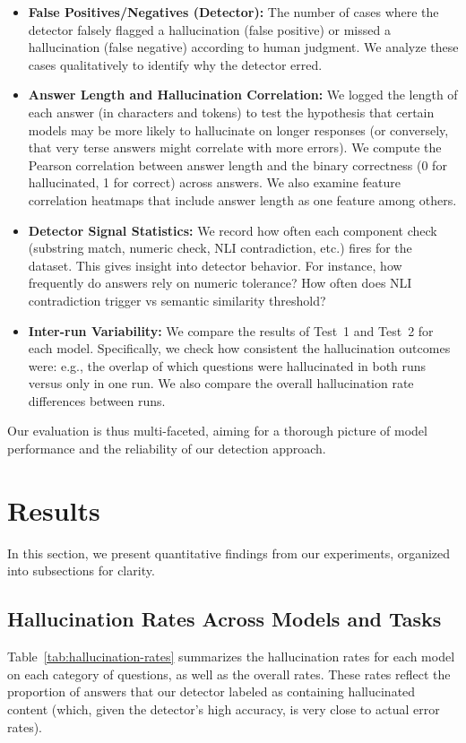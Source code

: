 \documentclass{article}
\begin{document}
\begin{itemize}
    \item \textbf{False Positives/Negatives (Detector):} The number of cases where the detector falsely flagged a hallucination (false positive) or missed a hallucination (false negative) according to human judgment. We analyze these cases qualitatively to identify why the detector erred.
    \item \textbf{Answer Length and Hallucination Correlation:} We logged the length of each answer (in characters and tokens) to test the hypothesis that certain models may be more likely to hallucinate on longer responses (or conversely, that very terse answers might correlate with more errors). We compute the Pearson correlation between answer length and the binary correctness (0 for hallucinated, 1 for correct) across answers. We also examine feature correlation heatmaps that include answer length as one feature among others.
    \item \textbf{Detector Signal Statistics:} We record how often each component check (substring match, numeric check, NLI contradiction, etc.) fires for the dataset. This gives insight into detector behavior. For instance, how frequently do answers rely on numeric tolerance? How often does NLI contradiction trigger vs semantic similarity threshold?
    \item \textbf{Inter-run Variability:} We compare the results of Test~1 and Test~2 for each model. Specifically, we check how consistent the hallucination outcomes were: e.g., the overlap of which questions were hallucinated in both runs versus only in one run. We also compare the overall hallucination rate differences between runs.
\end{itemize}

Our evaluation is thus multi-faceted, aiming for a thorough picture of model performance and the reliability of our detection approach.

\section{Results}\label{sec:results}
In this section, we present quantitative findings from our experiments, organized into subsections for clarity.

\subsection{Hallucination Rates Across Models and Tasks}
Table~\ref{tab:hallucination-rates} summarizes the hallucination rates for each model on each category of questions, as well as the overall rates. These rates reflect the proportion of answers that our detector labeled as containing hallucinated content (which, given the detector’s high accuracy, is very close to actual error rates).
\end{document}
